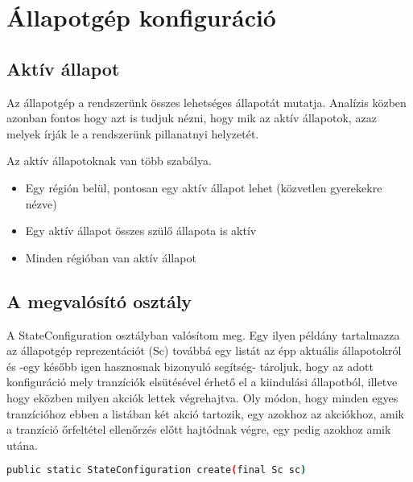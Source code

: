 \chapter{Állapotgép konfiguráció}
\label{sec:stateconfig}
\section{Aktív állapot}
Az állapotgép a rendszerünk összes lehetséges állapotát mutatja. Analízis közben azonban fontos hogy azt is tudjuk nézni, hogy mik az aktív állapotok, azaz melyek írják le a rendszerünk pillanatnyi helyzetét.

Az aktív állapotoknak van több szabálya.
\begin{itemize}
	\item Egy régión belül, pontosan egy aktív állapot lehet (közvetlen gyerekekre nézve)
	\item Egy aktív állapot összes szülő állapota is aktív
	\item Minden régióban van aktív állapot
\end{itemize}

\section{A megvalósító osztály}

A StateConfiguration osztályban valósítom meg. Egy ilyen példány tartalmazza az állapotgép reprezentációt (Sc) továbbá egy listát az épp aktuális állapotokról és -egy később igen hasznosnak bizonyuló segítség- tároljuk, hogy az adott konfiguráció mely tranzíciók elsütésével érhető el a kiindulási állapotból, illetve hogy eközben milyen akciók lettek végrehajtva. Oly módon, hogy minden egyes tranzícióhoz ebben a listában két akció tartozik, egy azokhoz az akciókhoz, amik a tranzíció őrfeltétel ellenőrzés előtt hajtódnak végre, egy pedig azokhoz amik utána.

\begin{lstlisting}[language=bash,morekeywords={sudo,apt\-get},alsoletter={-},breaklines=true]
public static StateConfiguration create(final Sc sc)
\end{lstlisting}

